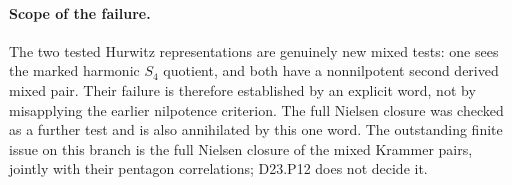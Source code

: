 \paragraph{Scope of the failure.}
The two tested Hurwitz representations are genuinely new mixed
tests: one sees the marked harmonic $S_4$ quotient, and both
have a nonnilpotent second derived mixed pair. Their failure is
therefore established by an explicit word, not by misapplying
the earlier nilpotence criterion. The full Nielsen closure was
checked as a further test and is also annihilated by this one
word. The outstanding finite issue on this branch is the full
Nielsen closure of the mixed Krammer pairs, jointly with their
pentagon correlations; D23.P12 does not decide it.
